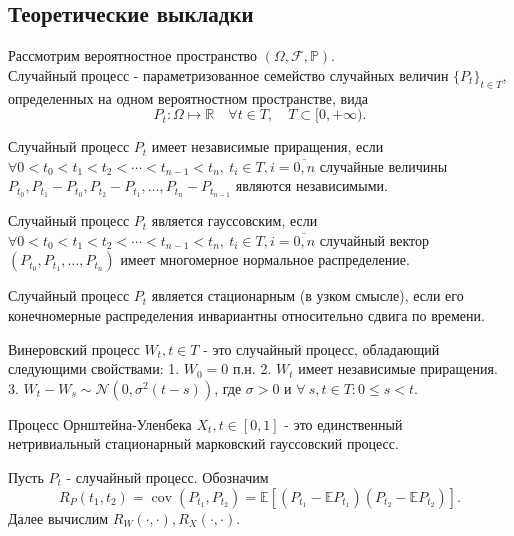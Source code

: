 \documentclass[11pt]{report}
\begin{document}
\subsection{Теоретические выкладки}

\begin{definition}
Рассмотрим вероятностное пространство $(\Omega,\mathcal{F},\mathbb{P})$. \\
Случайный процесс - параметризованное семейство случайных величин $\{P_t\}_{t\in T}$, определенных на одном вероятностном пространстве, вида
$$
P_t: \Omega\mapsto \mathbb{R}\quad\forall t\in T,\quad T\subset[0,+\infty).
$$
\end{definition}

\begin{definition}
Случайный процесс $P_t$ имеет независимые приращения, если $\forall 0<t_0<t_1<t_2<\cdots<t_{n-1}<t_n,~ t_i\in T,i=\overline{0,n}$ случайные величины $P_{t_0}, P_{t_1}-P_{t_0}, P_{t_2}-P_{t_1}, \dots, P_{t_n}-P_{t_{n-1}}$ являются независимыми.
\end{definition}

\begin{definition}
Случайный процесс $P_t$ является гауссовским, если $\forall 0<t_0<t_1<t_2<\cdots<t_{n-1}<t_n,~ t_i\in T,i=\overline{0,n}$ случайный вектор $(P_{t_0},P_{t_1},\dots,P_{t_n})$ имеет многомерное нормальное распределение.
\end{definition}

\begin{definition}
Случайный процесс $P_t$ является стационарным (в узком смысле), если его конечномерные распределения инвариантны относительно сдвига по времени.
\end{definition}

\begin{definition}
Винеровский процесс $W_t,t\in T$ - это случайный процесс, обладающий следующими свойствами:
1. $W_0 = 0$ п.н.
2. $W_t$ имеет независимые приращения.
3. $W_t-W_s \sim \mathcal{N}(0, \sigma^2(t-s))$, где $\sigma>0$ и $\forall~s,t\in T:0\leqslant s<t$.
\end{definition}

\begin{definition}
Процесс Орнштейна-Уленбека $X_t,t\in[0,1]$ - это единственный \\
нетривиальный стационарный марковский гауссовский процесс.
\end{definition}

Пусть $P_t$ - случайный процесс. Обозначим
$$
R_P(t_1, t_2) = \operatorname{cov}(P_{t_1},P_{t_2}) = \mathbb{E}[(P_{t_1}-\mathbb{E}P_{t_1})(P_{t_2}-\mathbb{E}P_{t_2})].
$$
Далее вычислим $R_W(\cdot,\cdot), R_X(\cdot,\cdot)$.
\end{document}
